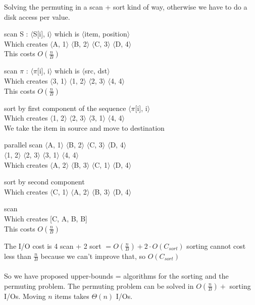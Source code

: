 \documentclass[10pt]{report}
\begin{document}
Solving the permuting in a scan + sort kind of way, otherwise we have to do a disk access per value.\\
\begin{list}{}{}
	\item scan S : $\langle$S[i], i$\rangle$ which is $\langle$item, position$\rangle$\\
	Which creates $\langle$A, 1$\rangle$ $\langle$B, 2$\rangle$ $\langle$C, 3$\rangle$ $\langle$D, 4$\rangle$\\
	This costs $O(\frac{n}{B})$
	\item scan $\pi$ : $\langle\pi$[i], i$\rangle$ which is $\langle$src, dst$\rangle$\\
	Which creates $\langle$3, 1$\rangle$ $\langle$1, 2$\rangle$ $\langle$2, 3$\rangle$ $\langle$4, 4$\rangle$\\
	This costs $O(\frac{n}{B})$
	\item sort by first component of the sequence $\langle\pi$[i], i$\rangle$\\
	Which creates $\langle$1, 2$\rangle$ $\langle$2, 3$\rangle$ $\langle$3, 1$\rangle$ $\langle$4, 4$\rangle$\\
	We take the item in source and move to destination
	\item parallel scan
	$\langle$A, 1$\rangle$ $\langle$B, 2$\rangle$ $\langle$C, 3$\rangle$ $\langle$D, 4$\rangle$\\
	$\langle$1, 2$\rangle$ $\langle$2, 3$\rangle$ $\langle$3, 1$\rangle$ $\langle$4, 4$\rangle$\\
	Which creates $\langle$A, 2$\rangle$ $\langle$B, 3$\rangle$ $\langle$C, 1$\rangle$ $\langle$D, 4$\rangle$\\
	\item sort by second component\\
	Which creates $\langle$C, 1$\rangle$ $\langle$A, 2$\rangle$ $\langle$B, 3$\rangle$ $\langle$D, 4$\rangle$\\
	\item scan\\
	Which creates [C, A, B, B]\\
	This costs $O(\frac{n}{B})$
\end{list}
The I/O cost is 4 scan + 2 sort $= O(\frac{n}{B}) + 2\cdot O(C_{sort})$ sorting cannot cost less than $\frac{n}{B}$ because we can't improve that, so $O(C_{sort})$\\\\
So we have proposed upper-bounds = algorithms for the sorting and the permuting problem. The permuting problem can be solved in $O(\frac{n}{B}) +$ sorting I/Os. Moving $n$ items takes $\Theta(n)$ I/Os.\\
\end{document}
